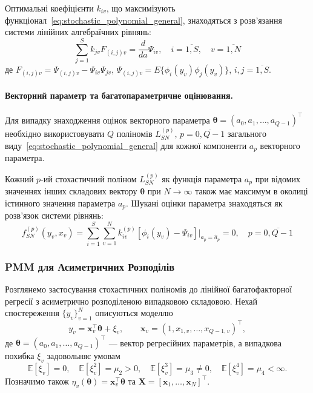 \documentclass[12pt,a4paper]{article}
\newcommand{\thetavec}{\boldsymbol{\theta}}
\begin{document}
Оптимальні коефіцієнти $k_{iv}$, що максимізують функціонал~\eqref{eq:stochastic_polynomial_general}, знаходяться з розв'язання системи лінійних алгебраїчних рівнянь:
\begin{equation}
\label{eq:optimal_coefficients}
\sum_{j=1}^{S} k_{jv} F_{(i,j)v} = \frac{d}{da} \Psi_{iv}, \quad i=\overline{1,S}, \quad v=\overline{1,N}
\end{equation}
де $F_{(i,j)v} = \Psi_{(i,j)v} - \Psi_{iv} \Psi_{jv}$, $\Psi_{(i,j)v} = E\{\phi_i(y_v)\phi_j(y_v)\}$, $i, j = \overline{1,S}$.

\paragraph{Векторний параметр та багатопараметричне оцінювання.}

Для випадку знаходження оцінок векторного параметра $\thetavec = (a_0, a_1, \ldots, a_{Q-1})^\top$ необхідно використовувати $Q$ поліномів $L_{SN}^{(p)}$, $p=\overline{0, Q-1}$ загального виду~\eqref{eq:stochastic_polynomial_general} для кожної компоненти $a_p$ векторного параметра.

Кожний $p$-ий стохастичний поліном $L_{SN}^{(p)}$ як функція параметра $a_p$ при відомих значеннях інших складових вектору $\boldsymbol{\theta}$ при $N \to \infty$ також має максимум в околиці істинного значення параметра $a_p$. Шукані оцінки параметра знаходяться як розв'язок системи рівнянь:
\begin{equation}
\label{eq:vector_estimation}
f_{SN}^{(p)}(y_v, x_v) = \sum_{i=1}^{S} \sum_{v=1}^{N} k_{iv}^{(p)} [\phi_i(y_v) - \Psi_{iv}] \bigg|_{a_p=\hat{a}_p} = 0, \quad p=\overline{0,Q-1}
\end{equation}

\subsubsection{PMM для Асиметричних Розподілів}

Розглянемо застосування стохастичних поліномів до лінійної багатофакторної регресії з асиметрично розподіленою випадковою складовою. Нехай спостереження $\{y_v\}_{v=1}^N$ описуються моделлю
\begin{equation}
\label{eq:multiple_regression_model}
y_v = \boldsymbol{x}_v^\top \boldsymbol{\theta} + \xi_v, \qquad \boldsymbol{x}_v = (1, x_{1,v}, \ldots, x_{Q-1,v})^\top,
\end{equation}
де $\boldsymbol{\theta} = (a_0, a_1, \ldots, a_{Q-1})^\top$ --- вектор регресійних параметрів, а випадкова похибка $\xi_v$ задовольняє умовам
\[
\mathbb{E}[\xi_v] = 0,\quad \mathbb{E}[\xi_v^2] = \mu_2 > 0,\quad \mathbb{E}[\xi_v^3] = \mu_3 \neq 0,\quad \mathbb{E}[\xi_v^4] = \mu_4 < \infty.
\]
Позначимо також $\eta_v(\boldsymbol{\theta}) = \boldsymbol{x}_v^\top \boldsymbol{\theta}$ та $\boldsymbol{X} = [\boldsymbol{x}_1, \ldots, \boldsymbol{x}_N]^\top$.
\end{document}
